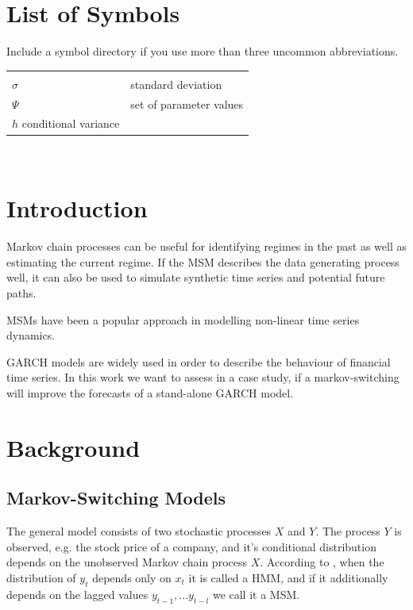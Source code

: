\documentclass[11pt,a4paper]{article}
\begin{document}
\section*{List of Symbols} 
\noindent Include a symbol directory if you use more than three uncommon abbreviations.
	\begin{tabular}{l l}
		\textbf{} & \\
		$\sigma$ & standard deviation\\
		$\Psi$ & set of parameter values \\
		$h$ conditional variance
	\end{tabular}\\ \vspace{1cm}


\newpage


\pagestyle{fancy}						
\fancyhf{}								
\fancyhead[R]{}							 
\renewcommand{\headrulewidth}{0pt}	 
\fancyfoot[R]{\thepage}				 
\renewcommand{\footrulewidth}{0pt}	 
\onehalfspacing	
\section{Introduction}
Markov chain processes can be useful for identifying regimes in the past as well as estimating the current regime. %
If the \ac{MSM} describes the data generating process well, it can also be used to simulate synthetic time series and potential future paths. %

\ac{MSM}s have been a popular approach in modelling non-linear time series dynamics.

\ac{GARCH} models are widely used in order to describe the behaviour of financial time series.
In this work we want to assess in a case study, if a markov-switching will improve the forecasts of a stand-alone GARCH model.


\section{Background}
\subsection{Markov-Switching Models}
The general model consists of two stochastic processes $X$ and $Y$. The process $Y$ is observed, e.g. the stock price of a company, and it's conditional distribution depends on the unobserved Markov chain process $X$. According to \cite{an_identifiability_2013}, when the distribution of $y_t$ depends only on $x_t$ it is called a \ac{HMM}, and if it additionally depends  on the lagged values $y_{t-1}, ... y_{t-l}$ we call it a \ac{MSM}.
\end{document}

